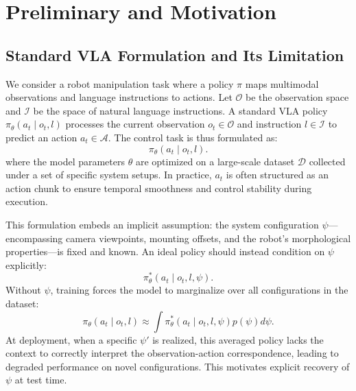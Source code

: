 


\section{Preliminary and Motivation}
\label{sec:analysis}

\subsection{Standard VLA Formulation and Its Limitation}


We consider a robot manipulation task where a policy $\pi$ maps multimodal observations and language instructions to actions. Let $\mathcal{O}$ be the observation space and $\mathcal{I}$ be the space of natural language instructions. A standard VLA policy $\pi_\theta\left(a_t \mid o_t, l\right)$ processes the current observation $o_t \in \mathcal{O}$ and instruction $l \in \mathcal{I}$ to predict an action $a_t \in \mathcal{A}$. The control task is thus formulated as:
\begin{equation}
\pi_\theta\left(a_t \mid o_t, l\right).
\end{equation}
where the model parameters $\theta$ are optimized on a large-scale dataset $\mathcal{D}$ collected under a set of specific system setups. In practice, $a_t$ is often structured as an action chunk to ensure temporal smoothness and control stability during execution.


This formulation embeds an implicit assumption: the system configuration 
$\psi$—encompassing camera viewpoints, mounting offsets, and the robot's 
morphological properties—is fixed and known. An ideal policy should instead 
condition on $\psi$ explicitly:
\begin{equation}
\pi_\theta^*\left(a_t \mid o_t, l, \psi\right).
\end{equation}
Without $\psi$, training forces the model to marginalize over all 
configurations in the dataset:
\begin{equation}
\pi_\theta\left(a_t \mid o_t, l\right) \approx \int \pi_\theta^*\left(a_t \mid o_t, l, \psi\right) 
p\left(\psi\right) d\psi.
\end{equation}
At deployment, when a specific $\psi'$ is realized, this averaged policy 
lacks the context to correctly interpret the observation-action correspondence, 
leading to degraded performance on novel configurations. This motivates 
explicit recovery of $\psi$ at test time.


